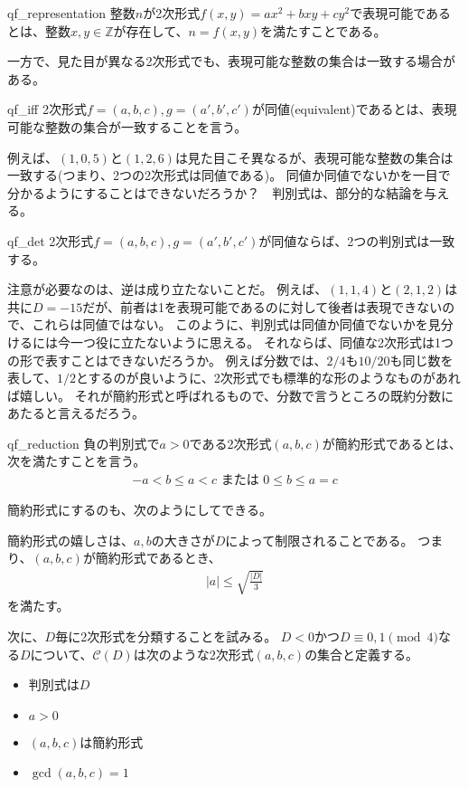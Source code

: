 \begin{Defi}{}{qf_representation}
整数$n$が2次形式$f(x,y)=ax^2+bxy+cy^2$で表現可能であるとは、整数$x,y\in\mathbb{Z}$が存在して、$n=f(x,y)$を満たすことである。
\end{Defi}

一方で、見た目が異なる2次形式でも、表現可能な整数の集合は一致する場合がある。

\begin{Defi}{}{qf_iff}
2次形式$f=(a,b,c),g=(a',b',c')$が同値(equivalent)であるとは、表現可能な整数の集合が一致することを言う。
\end{Defi}

例えば、$(1,0,5)$と$(1,2,6)$は見た目こそ異なるが、表現可能な整数の集合は一致する(つまり、2つの2次形式は同値である)。
同値か同値でないかを一目で分かるようにすることはできないだろうか？　判別式は、部分的な結論を与える。

\begin{Prop}{}{qf_det}
2次形式$f=(a,b,c),g=(a',b',c')$が同値ならば、2つの判別式は一致する。
\end{Prop}

注意が必要なのは、逆は成り立たないことだ。
例えば、$(1,1,4)$と$(2,1,2)$は共に$D=-15$だが、前者は1を表現可能であるのに対して後者は表現できないので、これらは同値ではない。
このように、判別式は同値か同値でないかを見分けるには今一つ役に立たないように思える。
それならば、同値な2次形式は1つの形で表すことはできないだろうか。
例えば分数では、$2/4$も$10/20$も同じ数を表して、$1/2$とするのが良いように、2次形式でも標準的な形のようなものがあれば嬉しい。
それが簡約形式と呼ばれるもので、分数で言うところの既約分数にあたると言えるだろう。

\begin{Defi}{}{qf_reduction}
負の判別式で$a>0$である2次形式$(a,b,c)$が簡約形式であるとは、次を満たすことを言う。
\begin{align*}
-a < b \le a < c \mbox{ または } 0 \le b \le a = c
\end{align*}
\end{Defi}

簡約形式にするのも、次のようにしてできる。


簡約形式の嬉しさは、$a,b$の大きさが$D$によって制限されることである。
つまり、$(a,b,c)$が簡約形式であるとき、
\begin{align*}
|a| \le \sqrt{\frac{|D|}{3}}
\end{align*}
を満たす。

次に、$D$毎に2次形式を分類することを試みる。
$D<0$かつ$D\equiv0,1\pmod{4}$なる$D$について、$\mathcal{C}(D)$は次のような2次形式$(a,b,c)$の集合と定義する。
\begin{itemize}
 \item 判別式は$D$
 \item $a>0$
 \item $(a,b,c)$は簡約形式
 \item $\gcd(a,b,c)=1$
\end{itemize}


